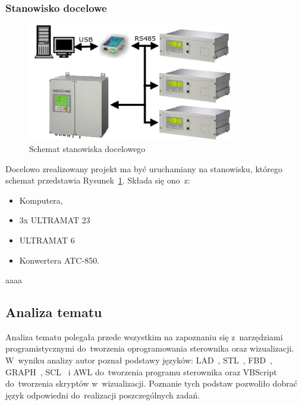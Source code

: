 \subsubsection{Stanowisko docelowe}
\begin{figure}[!htb] 	\centering 	\includegraphics[width=0.8\textwidth]{images/schemat2} 	\caption{Schemat stanowiska docelowego} \label{schemat2} \end{figure} 
Docelowo zrealizowany projekt ma być uruchamiany na stanowisku, którego schemat przedstawia Rysunek~\ref{schemat2}. Składa się ono~z:
\begin{itemize}
\item Komputera,
\item 3x ULTRAMAT 23
\item ULTRAMAT 6
\item Konwertera ATC-850.
\end{itemize}
\indent
\indent aaaa

\subsection{Analiza tematu}
Analiza tematu polegała przede wszystkim na zapoznaniu się z~narzędziami programistycznymi do~tworzenia oprogramowania sterownika oraz wizualizacji.
W~wyniku analizy autor poznał podstawy języków: LAD~\cite{step1,step2,step3}, STL~\cite{step1,step2,step3}, FBD~\cite{step1,step2,step3}, GRAPH~\cite{step3}, SCL~\cite{scl1,scl2,scl3} i AWL do~tworzenia programu sterownika oraz VBScript do~tworzenia skryptów w~wizualizacji. Poznanie tych podstaw pozwoliło dobrać język odpowiedni do~realizacji poszczególnych zadań.

